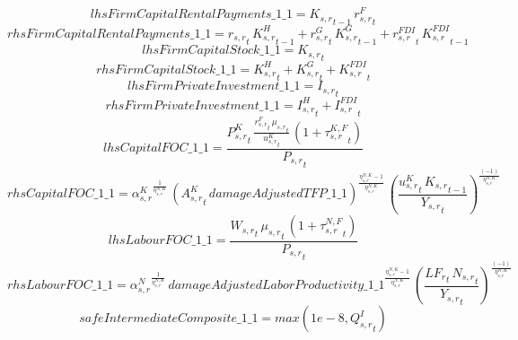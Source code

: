 \begin{dmath*}
lhsFirmCapitalRentalPayments\_1\_1 = {{K_{s,r}}}_{t-1}\, {{r^F_{s,r}}}_{t}
\end{dmath*}
\begin{dmath*}
rhsFirmCapitalRentalPayments\_1\_1 = {{r_{s,r}}}_{t}\, {{K^H_{s,r}}}_{t-1}+{{r^G_{s,r}}}_{t}\, {{K^G_{s,r}}}_{t-1}+{{r^{FDI}_{s,r}}}_{t}\, {{K^{FDI}_{s,r}}}_{t-1}
\end{dmath*}
\begin{dmath*}
lhsFirmCapitalStock\_1\_1 = {{K_{s,r}}}_{t}
\end{dmath*}
\begin{dmath*}
rhsFirmCapitalStock\_1\_1 = {{K^H_{s,r}}}_{t}+{{K^G_{s,r}}}_{t}+{{K^{FDI}_{s,r}}}_{t}
\end{dmath*}
\begin{dmath*}
lhsFirmPrivateInvestment\_1\_1 = {{I_{s,r}}}_{t}
\end{dmath*}
\begin{dmath*}
rhsFirmPrivateInvestment\_1\_1 = {{I^H_{s,r}}}_{t}+{{I^{FDI}_{s,r}}}_{t}
\end{dmath*}
\begin{dmath*}
lhsCapitalFOC\_1\_1 = \frac{{{P^K_{s,r}}}_{t}\, \frac{{{r^F_{s,r}}}_{t}\, {{\mu_{s,r}}}_{t}}{{{u^K_{s,r}}}_{t}}\, \left(1+{{\tau^{K,F}_{s,r}}}_{t}\right)}{{{P_{s,r}}}_{t}}
\end{dmath*}
\begin{dmath*}
rhsCapitalFOC\_1\_1 = {{\alpha^{K}_{s,r}}}^{\frac{1}{{{\eta^{N,K}_{s,r}}}}}\, \left({{A^{K}_{s,r}}}_{t}\, {damageAdjustedTFP\_1\_1}\right)^{\frac{{{\eta^{N,K}_{s,r}}}-1}{{{\eta^{N,K}_{s,r}}}}}\, \left(\frac{{{u^K_{s,r}}}_{t}\, {{K_{s,r}}}_{t-1}}{{{Y_{s,r}}}_{t}}\right)^{\frac{\left(-1\right)}{{{\eta^{N,K}_{s,r}}}}}
\end{dmath*}
\begin{dmath*}
lhsLabourFOC\_1\_1 = \frac{{{W_{s,r}}}_{t}\, {{\mu_{s,r}}}_{t}\, \left(1+{{\tau^{N,F}_{s,r}}}_{t}\right)}{{{P_{s,r}}}_{t}}
\end{dmath*}
\begin{dmath*}
rhsLabourFOC\_1\_1 = {{\alpha^{N}_{s,r}}}^{\frac{1}{{{\eta^{N,K}_{s,r}}}}}\, {damageAdjustedLaborProductivity\_1\_1}^{\frac{{{\eta^{N,K}_{s,r}}}-1}{{{\eta^{N,K}_{s,r}}}}}\, \left(\frac{{{LF_r}}_{t}\, {{N_{s,r}}}_{t}}{{{Y_{s,r}}}_{t}}\right)^{\frac{\left(-1\right)}{{{\eta^{N,K}_{s,r}}}}}
\end{dmath*}
\begin{dmath*}
safeIntermediateComposite\_1\_1 = max(1e-8,{{Q^{I}_{s,r}}}_{t})
\end{dmath*}
